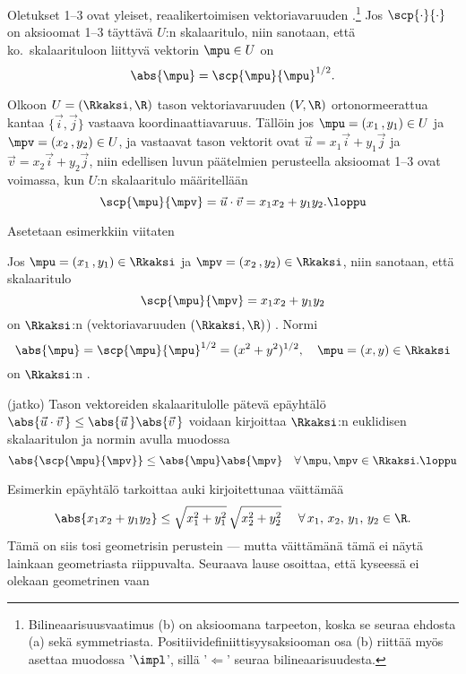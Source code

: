 Oletukset 1--3 ovat yleiset, reaalikertoimisen vektoriavaruuden 
.\footnote[2]{Bilineaarisuusvaatimus (b) on aksioomana tarpeeton,
koska se seuraa ehdosta (a) sekä symmetriasta. Positiividefiniittisyysaksiooman osa (b) riittää
myös asettaa muodossa '$\impl$', sillä '$\Leftarrow$' seuraa bilineaarisuudesta.} Jos 
$\scp{\cdot}{\cdot}$ on aksioomat 1--3 täyttävä $U$:n skalaaritulo, niin sanotaan, että ko.\ 
skalaarituloon liittyvä vektorin $\mpu \in U$  on 
\[ 
\abs{\mpu} = \scp{\mpu}{\mpu}^{1/2}.
\]
\begin{Exa} Olkoon $U=(\Rkaksi,\R)$ tason vektoriavaruuden $(V,\R)$ ortonormeerattua kantaa
$\{\vec i,\vec j\}$ vastaava koordinaattiavaruus. Tällöin jos $\mpu=(x_1\,,y_1) \in U$ ja 
$\mpv=(x_2\,,y_2) \in U$, ja vastaavat tason vektorit ovat $\vec u=x_1\vec i+y_1\vec j$ ja
$\vec v=x_2\vec i+y_2\vec j$, niin edellisen luvun päätelmien perusteella aksioomat 1--3 ovat 
voimassa, kun $U$:n skalaaritulo määritellään
\[
\scp{\mpu}{\mpv}=\vec u\cdot\vec v=x_1 x_2 + y_1 y_2. \loppu
\]
\end{Exa}
Asetetaan esimerkkiin viitaten
\begin{Def} \label{R2:n euklidinen skalaaritulo ja normi}
 
\index{skalaaritulo!c@$\R^n$:n euklidinen|emph} 
Jos $\mpu=(x_1\,,y_1)\in\Rkaksi$ ja $\mpv=(x_2\,,y_2)\in\Rkaksi$, niin sanotaan, että
skalaaritulo
\[
\scp{\mpu}{\mpv}=x_1 x_2 + y_1 y_2
\]
on $\Rkaksi$:n (vektoriavaruuden $(\Rkaksi,\R)$) . Normi
\[
\abs{\mpu} = \scp{\mpu}{\mpu}^{1/2} = (x^2+y^2)^{1/2}, \quad \mpu=(x,y)\in\Rkaksi
\]
on $\Rkaksi$:n .
\end{Def}
\jatko \begin{Exa} (jatko) Tason vektoreiden skalaaritulolle pätevä epäyhtälö
$\abs{\vec u\cdot\vec v\,} \le \abs{\vec u\,}\abs{\vec v\,}$ voidaan kirjoittaa $\Rkaksi$:n
euklidisen skalaaritulon ja normin avulla muodossa
\[
\abs{\scp{\mpu}{\mpv}}\le\abs{\mpu}\abs{\mpv} \quad \forall\,\mpu,\mpv\in\Rkaksi. \loppu
\]
\end{Exa}
Esimerkin epäyhtälö tarkoittaa auki kirjoitettunaa väittämää
\[
\abs{x_1 x_2 + y_1 y_2} \le \sqrt{x_1^2+y_1^2}\,\sqrt{x_2^2+y_2^2}\ \quad 
                                           \forall\,x_1,\,x_2,\,y_1,\,y_2\in\R.
\]
Tämä on siis tosi geometrisin perustein --- mutta väittämänä tämä ei näytä lainkaan geometriasta
riippuvalta. Seuraava lause osoittaa, että kyseessä ei olekaan geometrinen vaan 
